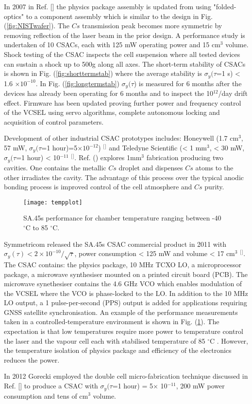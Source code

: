 In 2007 in Ref. [] the physics package assembly is updated from using "folded-optics" to a component assembly which is similar to the design in Fig. (\ref{fig:NISTwafer}). The $Cs$ transmission peak becomes more symmetric by removing reflection of the laser beam in the prior design. A performance study is undertaken of 10 CSACs, each with 125 mW operating power and 15 cm$^{3}$ volume. Shock testing of the CSAC inspects the cell suspension where all tested devices can sustain a shock up to 500g along all axes. The short-term stability of CSACs is shown in Fig. (\ref{fig:shorttermstab}) where the average stability is $\sigma_{y}(\tau$=1 s) < 1.6 $\times 10^{-10}$. In Fig. (\ref{fig:longtermstab}) $\sigma_{y}(\tau$) is measured for 6 months after the devices has already been operating for 6 months and to inspect the 10$^{12}$/day drift effect. Firmware has been updated proving further power and frequency control of the VCSEL using servo algorithms, complete autonomous locking and acquisition of control parameters.   


Development of other industrial CSAC prototypes includes: Honeywell (1.7 cm$^{3}$, 57 mW, $\sigma_{y}(\tau$=1 hour)=5$\times 10^{-12}$) $^[$\citep{Youngner2007AClock}$^]$ and Teledyne Scientific (< 1 mm$^{3}$, < 30 mW, $\sigma_{y}(\tau$=1 hour) < 10$^{-11}$ $^[$\citep{DeNatale2008CompactClock}$^]$. Ref. () explores 1mm$^{3}$ fabrication producing two cavities. One contains the metallic $Cs$ droplet and dispenses $Cs$ atoms to the other irradiates the cavity. The advantage of this process over the typical anodic bonding process is improved control of the cell atmosphere and $Cs$ purity. 

\begin{figure}[b]
\centering
\texttt{[image: tempplot]}
\caption{\label{fig:tempplot}SA.45s performance for chamber temperature ranging between -40 $^{\circ }\textrm{C}$ to 85 $^{\circ }\textrm{C}$.}
\end{figure}

Symmetricom released the SA.45s CSAC commercial product in 2011 with $\sigma_{y}(\tau) < 2\times 10^{-10}/\sqrt{\tau}$, power consumption < 125 mW and volume < 17 cm$^{3}$ $^[$\citep{articleb}$^]$. The CSAC contains: the physics package, 10 MHz TCXO LO, a microprocessor package, a microwave synthesiser mounted on a printed circuit board (PCB). The microwave synethesiser contains the 4.6 GHz VCO which enables modulation of the VCSEL where the VCO is phase-locked to the LO. In addition to the 10 MHz LO output, a 1 pulse-per-second (PPS) output is added for applications requiring GNSS satellite synchronisation. An example of the performance measurements taken in a controlled-temperature environment is shown in Fig. (\ref{fig:tempplot}). The expectation is that low temperatures require more power to temperature control the laser and the vapour cell each with stabilised temperature of 85 $^{\circ }\textrm{C}$ \citep{LutwakR.RashedA.Varghese2007TheEvaluation}. However, the temperature isolation of physics package and efficiency of the electronics reduces the power.

In 2012 Gorecki employed the double cell micro-fabrication technique discussed in Ref. [\citep{Douahi2007VapourStandard}] to produce a CSAC with $\sigma_{y}(\tau$=1 hour) = 5$\times$ 10$^{-11}$, 200 mW power consumption and tens of cm$^{3}$ volume. 




